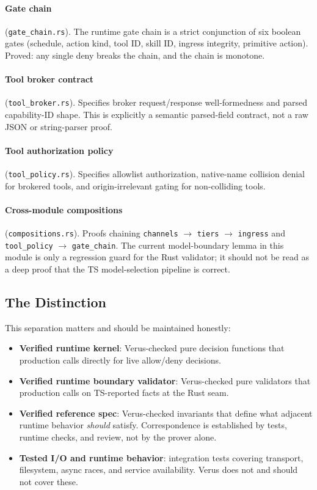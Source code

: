 \documentclass[11pt]{article}
\begin{document}
\paragraph{Gate chain} (\texttt{gate\_chain.rs}). The runtime gate chain is a strict conjunction of six boolean gates (schedule, action kind, tool ID, skill ID, ingress integrity, primitive action). Proved: any single deny breaks the chain, and the chain is monotone.

\paragraph{Tool broker contract} (\texttt{tool\_broker.rs}). Specifies broker request/response well-formedness and parsed capability-ID shape. This is explicitly a semantic parsed-field contract, not a raw JSON or string-parser proof.

\paragraph{Tool authorization policy} (\texttt{tool\_policy.rs}). Specifies allowlist authorization, native-name collision denial for brokered tools, and origin-irrelevant gating for non-colliding tools.

\paragraph{Cross-module compositions} (\texttt{compositions.rs}). Proofs chaining \texttt{channels} $\to$ \texttt{tiers} $\to$ \texttt{ingress} and \texttt{tool\_policy} $\to$ \texttt{gate\_chain}. The current model-boundary lemma in this module is only a regression guard for the Rust validator; it should not be read as a deep proof that the TS model-selection pipeline is correct.

\subsection{The Distinction}
This separation matters and should be maintained honestly:
\begin{itemize}[leftmargin=1.5em]
\item \textbf{Verified runtime kernel}: Verus-checked pure decision functions that production calls directly for live allow/deny decisions.
\item \textbf{Verified runtime boundary validator}: Verus-checked pure validators that production calls on TS-reported facts at the Rust seam.
\item \textbf{Verified reference spec}: Verus-checked invariants that define what adjacent runtime behavior \emph{should} satisfy. Correspondence is established by tests, runtime checks, and review, not by the prover alone.
\item \textbf{Tested I/O and runtime behavior}: integration tests covering transport, filesystem, async races, and service availability. Verus does not and should not cover these.
\end{itemize}
\end{document}
